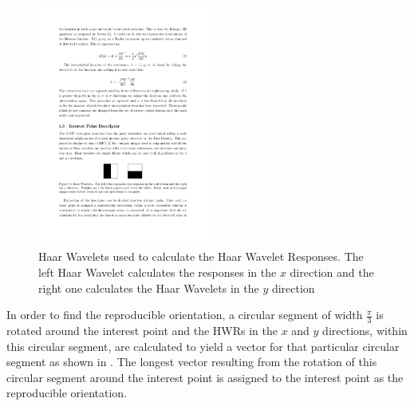\documentclass[11pt]{report}
\begin{document}
\begin{figure}[h!] 
  \centering
    \includegraphics[width=0.5\textwidth]{../Drawings/methods/SURF2D_HaarWavelets.pdf}
    \caption{Haar Wavelets used to calculate the Haar Wavelet Responses. The left Haar Wavelet calculates the responses in the $x$ direction and the right one calculates the Haar Wavelets in the $y$ direction}
    \label{fig:haar}
\end{figure}

In order to find the reproducible orientation, a circular segment of width $\frac{\pi}{3}$ is rotated around the interest point and the HWRs in the $x$ and $y$ directions, within this circular segment, are calculated to yield a vector for that particular circular segment as shown in  \cite{Evans2009}. The longest vector resulting from the rotation of this circular segment around the interest point is assigned to the interest point as the reproducible orientation.\\
\end{document}
